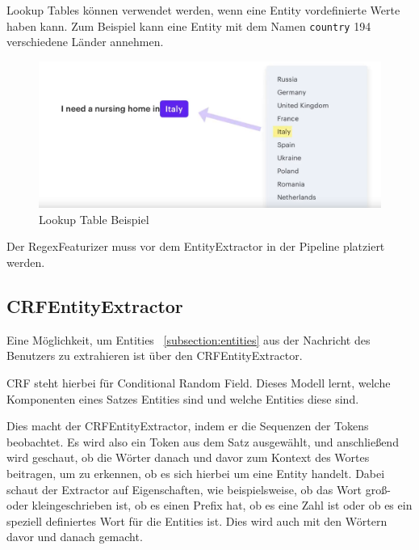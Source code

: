 Lookup Tables können verwendet werden, wenn eine Entity vordefinierte Werte haben kann.
Zum Beispiel kann eine Entity mit dem Namen \texttt{country} 194 verschiedene Länder annehmen.\cite{rasaMasterclassRegexFeaturizer, pipelineComponentsYoutube, regexFeaturizerCrf}

\begin{figure}[hbt!]
    \centering
    \includegraphics[scale=0.25]{pics/lookup-table-example}
    \caption{Lookup Table Beispiel~\cite{pipelineComponentsYoutube}}
    \label{fig:Lookup Table Beispiel}
\end{figure}

Der RegexFeaturizer muss vor dem EntityExtractor in der Pipeline platziert werden.\cite{rasaMasterclassRegexFeaturizer, pipelineComponentsYoutube, regexFeaturizerCrf}

\subsection{CRFEntityExtractor}\label{subsec:crfentityextractor}

Eine Möglichkeit, um Entities ~\ref{subsection:entities} aus der Nachricht des Benutzers zu extrahieren ist über den CRFEntityExtractor.\cite{crfEntityExtractor}

CRF steht hierbei für Conditional Random Field.
Dieses Modell lernt, welche Komponenten eines Satzes Entities sind und welche Entities diese sind.\cite{crfEntityExtractor, pipelineComponentsYoutube, regexFeaturizerCrf}

Dies macht der CRFEntityExtractor, indem er die Sequenzen der Tokens beobachtet.
Es wird also ein Token aus dem Satz ausgewählt, und anschließend wird geschaut, ob die Wörter danach und davor zum Kontext des Wortes beitragen, um zu erkennen, ob es sich hierbei um eine Entity handelt.
Dabei schaut der Extractor auf Eigenschaften, wie beispielsweise, ob das Wort groß- oder kleingeschrieben ist, ob es einen Prefix hat, ob es eine Zahl ist oder ob es ein speziell definiertes Wort für die Entities ist.
Dies wird auch mit den Wörtern davor und danach gemacht.\cite{crfEntityExtractor, pipelineComponentsYoutube, regexFeaturizerCrf}


